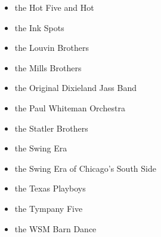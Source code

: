 \documentclass[12pt,a4paper]{article}
\begin{document}
\begin{itemize}
  \item the Hot Five and Hot
  \item the Ink Spots
  \item the Louvin Brothers
  \item the Mills Brothers
  \item the Original Dixieland Jass Band
  \item the Paul Whiteman Orchestra
  \item the Statler Brothers
  \item the Swing Era
  \item the Swing Era of Chicago's South Side
  \item the Texas Playboys
  \item the Tympany Five
  \item the WSM Barn Dance
\end{itemize}
\end{document}
